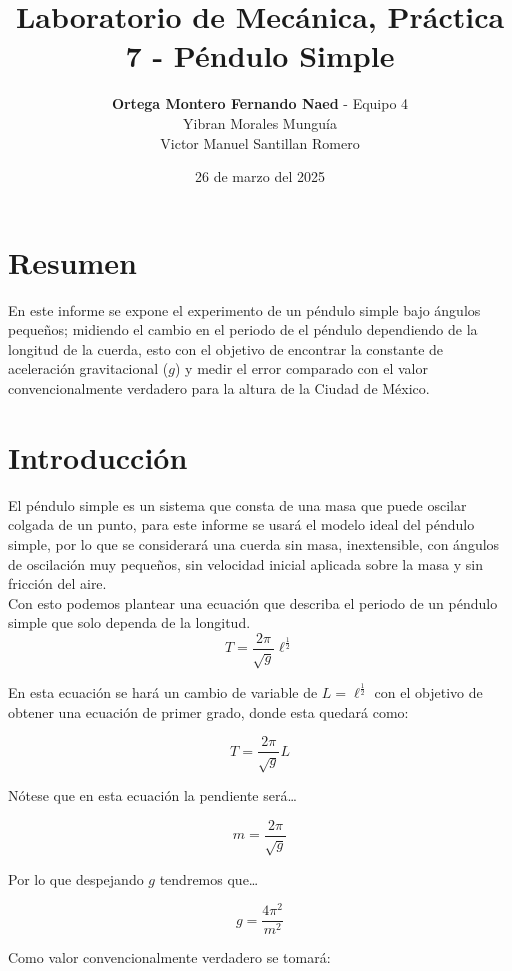 \documentclass[12pt,a4paper]{article}
\begin{document}
\title{Laboratorio de Mecánica, Práctica 7 - Péndulo Simple}
\date{26 de marzo del 2025}
\author{\textbf{Ortega Montero Fernando Naed} - Equipo 4\\
Yibran Morales Munguía\\
Victor Manuel Santillan Romero}
\maketitle
\section{Resumen} 

En este informe se expone el experimento de un péndulo simple bajo ángulos pequeños; midiendo el cambio en el periodo de el péndulo dependiendo de la longitud de la cuerda, esto con el objetivo de encontrar la constante de aceleración gravitacional ($g$) y medir el error comparado con el valor convencionalmente verdadero para la altura de la Ciudad de México. 

\section{Introducción}

El péndulo simple es un sistema que consta de una masa que puede oscilar colgada de un punto, para este informe se usará el modelo ideal del péndulo simple, por lo que se considerará una cuerda sin masa, inextensible, con ángulos de oscilación muy pequeños, sin velocidad inicial aplicada sobre la masa y sin fricción del aire.\\
Con esto podemos plantear una ecuación que describa el periodo de un péndulo simple que solo dependa de la longitud.\\

\[T = \frac{2\pi}{\sqrt{g}} \ell^{\frac{1}{2}}\]

En esta ecuación se hará un cambio de variable de $L = \ell^{\frac{1}{2}}$ con el objetivo de obtener una ecuación de primer grado, donde esta quedará como: 

\[T = \frac{2\pi}{\sqrt{g}} L\]

Nótese que en esta ecuación la pendiente será… 

\[m = \frac{2\pi}{\sqrt{g}}\]

Por lo que despejando $g$ tendremos que…

\[g = \frac{4\pi^2}{m^2}\]

Como valor convencionalmente verdadero se tomará:
\end{document}
